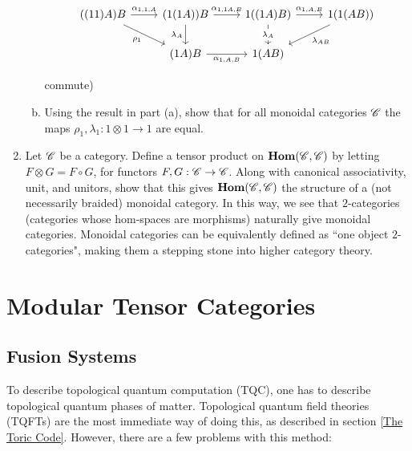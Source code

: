 \documentclass{article}
\theoremstyle{definition}
\numberwithin{figure}{section}
\begin{document}
\begin{enumerate}[\thesection .1.]
\begin{enumerate}[(a)]
\[\begin{tikzcd}
	{((11)A)B} & {(1(1A))B} & {1((1A)B)} & {1(1(AB))} \\
	& {(1A)B} & {1(AB)}
	\arrow["{\alpha_{1,1,A}}", from=1-1, to=1-2]
	\arrow["{\alpha_{1,1A,B}}", from=1-2, to=1-3]
	\arrow["{\alpha_{1,A,B}}", from=1-3, to=1-4]
	\arrow["{\lambda_{AB}}", from=1-4, to=2-3]
	\arrow["{\alpha_{1,A,B}}"', from=2-2, to=2-3]
	\arrow["{\lambda_A}"', from=1-2, to=2-2]
	\arrow["{\lambda_A}"{description}, from=1-3, to=2-3]
	\arrow["{\rho_1}"', from=1-1, to=2-2]
\end{tikzcd}\]

commute)

\item Using the result in part (a), show that for all monoidal categories $\mathscr{C}$ the maps $\rho_1,\lambda_1:1\otimes 1\to 1$ are equal.

\end{enumerate}

\item Let $\mathscr{C}$ be a category. Define a tensor product on $\bold{Hom}(\mathscr{C},\mathscr{C})$ by letting $F\otimes G=F\circ G$, for functors $F,G:\mathscr{C}\to \mathscr{C}$. Along with canonical associativity, unit, and unitors, show that this gives $\bold{Hom}(\mathscr{C},\mathscr{C})$ the structure of a (not necessarily braided) monoidal category. In this way, we see that $2$-categories (categories whose hom-spaces are morphisms) naturally give monoidal categories. Monoidal categories can be equivalently defined as ``one object $2$-categories", making them a stepping stone into higher category theory.

\end{enumerate}

\section{Modular Tensor Categories}
\label{Modular Tensor Categories}

\subsection{Fusion Systems}
\label{Fusion systems}

To describe topological quantum computation (TQC), one has to describe topological quantum phases of matter. Topological quantum field theories (TQFTs) are the most immediate way of doing this, as described in section \ref{The Toric Code}. However, there are a few problems with this method:
\end{document}
